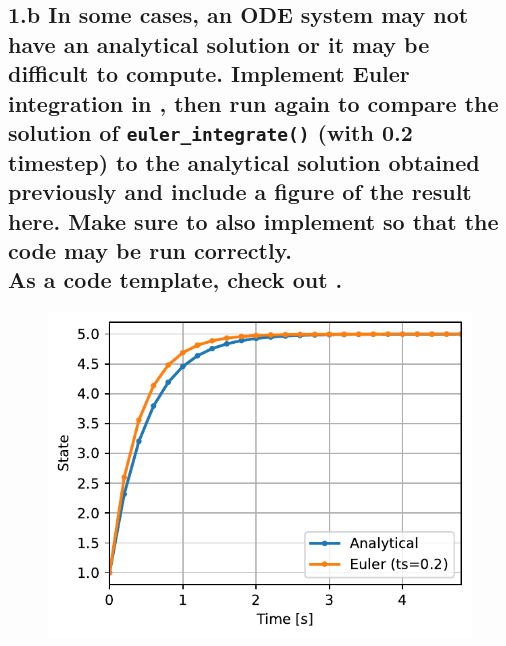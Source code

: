 \documentclass{cmc}
\begin{document}
\newpage
\subsection*{1.b In some cases, an ODE system may not have an analytical
  solution or it may be difficult to compute. Implement Euler integration in
  , %
  then run  again to compare the solution of
  \texttt{eu\-ler\_integr\-ate()} (with 0.2 timestep) %
  to the analytical solution obtained previously and include a figure of the
  result here. Make sure to also implement
  so that the code may be run correctly. \\ As a code template, check out
  .}





\begin{figure}[H]
  \centering \includegraphics[height=0.4\textheight]{figures/Euler_integration}
  \caption{}
\end{figure}


\end{document}
